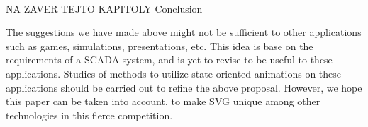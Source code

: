 \\NA ZAVER TEJTO KAPITOLY
Conclusion

The suggestions we have made above might not be sufficient to other applications such as games, simulations, presentations, etc. This idea is base on the requirements of a SCADA system, and is yet to revise to be useful to these applications. Studies of methods to utilize state-oriented animations on these applications should be carried out to refine the above proposal. However, we hope this paper can be taken into account, to make SVG unique among other technologies in this fierce competition.
